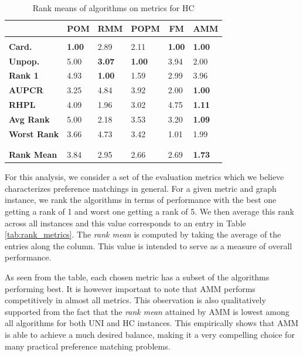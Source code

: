 \documentclass[letterpaper]{article} %
\begin{document}
\begin{table}[h]
\setlength\tabcolsep{4.2pt}
\begin{center}
\begin{tabular}{llllll}
\multicolumn{1}{c}{}
&\multicolumn{1}{c}{\bf POM}
&\multicolumn{1}{c}{\bf RMM}
&\multicolumn{1}{c}{\bf POPM}
&\multicolumn{1}{c}{\bf FM}
&\multicolumn{1}{c}{\bf AMM}
\\ \hline  \\
\textbf{Card.} & \textbf{1.00} & 2.89 & 2.11 & \textbf{1.00} & \textbf{1.00} \\
\textbf{Unpop.} &  5.00 & \textbf{3.07} & \textbf{1.00} & 3.94 & 2.00 \\
\textbf{Rank 1} & 4.93 & \textbf{1.00} & 1.59 & 2.99 & 3.96 \\
\textbf{AUPCR} & 3.25 & 4.84 & 3.92 & 2.00 & \textbf{1.00} \\
\textbf{RHPL} &  4.09 & 1.96 & 3.02 & 4.75 & \textbf{1.11} \\
\textbf{Avg Rank} &  5.00 & 2.18 & 3.53 & 3.20 & \textbf{1.09} \\
\textbf{Worst Rank} & 3.66 & 4.73 & 3.42 & 1.01 & 1.99 \\

\\ \hline \\
\textbf{Rank Mean} & 3.84 & 2.95 & 2.66 & 2.69 & \textbf{1.73} \\
\end{tabular}
\end{center}
\caption{Rank means of algorithms on metrics for HC}
\label{tab:rank_metrics2}
\end{table}
For this analysis, we consider a set of the evaluation metrics which we believe characterizes preference matchings in general. For a given metric and graph instance, we rank the algorithms in terms of performance with the best one getting a rank of 1 and worst one getting a rank of 5. We then average this rank across all instances and this value corresponds to an entry in Table \ref{tab:rank_metrics}. The \textit{rank mean} is computed by taking the average of the entries along the column. This value is intended to serve as a measure of overall performance.

As seen from the table, each chosen metric has a subset of the algorithms performing best. It is however important to note that AMM performs competitively in almost all metrics. This observation is also qualitatively supported from the fact that the \textit{rank mean} attained by AMM is lowest among all algorithms for both UNI and HC instances. This empirically shows that AMM is able to achieve a much desired balance, making it a very compelling choice for many practical preference matching problems.
\end{document}
